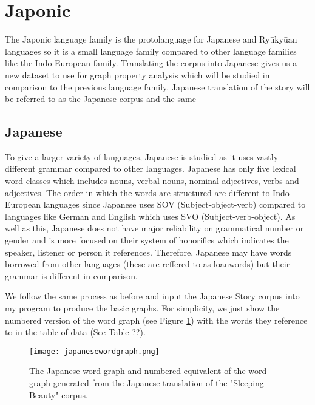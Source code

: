 \section{Japonic}
The Japonic language family is the protolanguage for Japanese and Ryūkyūan languages\cite{vovin2017origins} so it is a small language family compared to other language families like the Indo-European family. Translating the corpus into Japanese gives us a new dataset to use for graph property analysis which will be studied in comparison to the previous language family. Japanese translation of the story will be referred to as the Japanese corpus and the same 
\subsection{Japanese}
To give a larger variety of languages, Japanese is studied as it uses vastly different grammar compared to other languages. Japanese has only five lexical word classes which includes nouns, verbal nouns, nominal adjectives, verbs and adjectives. The order in which the words are structured are different to Indo-European languages since Japanese uses SOV (Subject-object-verb) compared to languages like German and English which uses SVO (Subject-verb-object). As well as this, Japanese does not have major reliability on grammatical number or gender and is more focused on their system of honorifics which indicates the speaker, listener or person it references. Therefore, Japanese may have words borrowed from other languages (these are reffered to as loanwords\cite{miura1979influence}) but their grammar is different in comparison. 

We follow the same process as before and input the Japanese Story corpus into my program to produce the basic graphs. For simplicity, we just show the numbered version of the word graph (see Figure \ref{fig:jpgraph}) with the words they reference to in the table of data (See Table ??).

\begin{figure}[H]
\centering
\texttt{[image: japanesewordgraph.png]}
\caption{The Japanese word graph and numbered equivalent of the word graph generated from the Japanese translation of the "Sleeping Beauty" corpus.}
\label{fig:jpgraph}
\end{figure}

